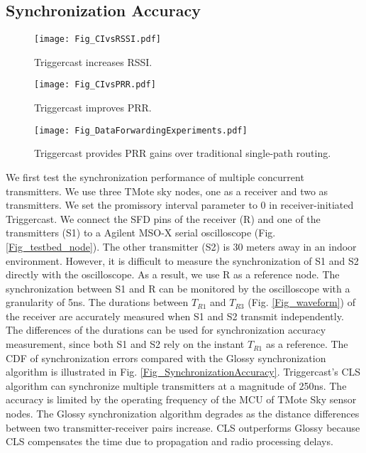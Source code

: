 \documentclass[conference]{IEEEtran}
\begin{document}
\subsection{Synchronization Accuracy}
\label{Subsec_SychronizationAccuracy}
\begin{figure*}[t]
  \centering
  \begin{minipage}[b]{0.32\textwidth}
    \centering
    \texttt{[image: Fig\_CIvsRSSI.pdf]}
    \caption{Triggercast increases RSSI.}
    \label{Fig_CIvsRSSI}\end{minipage}\hspace{0.01\linewidth}\begin{minipage}[b]{0.32\textwidth}
    \centering
    \texttt{[image: Fig\_CIvsPRR.pdf]}
    \caption{Triggercast improves PRR.}
    \label{Fig_CIvsPRR}
  \end{minipage}\hspace{0.01\linewidth}\begin{minipage}[b]{0.32\textwidth}
    \centering
    \texttt{[image: Fig\_DataForwardingExperiments.pdf]}
    \caption{Triggercast provides PRR gains over traditional single-path routing.}
    \label{Fig_DataForwardingExperiments}
  \end{minipage}\end{figure*}
\indent We first test the synchronization performance of multiple concurrent transmitters.
We use three TMote sky nodes, one as a receiver and two as transmitters.
We set the promissory interval parameter to 0 in receiver-initiated Triggercast.
We connect the SFD pins of the receiver (R) and one of the transmitters (S1) to a Agilent MSO-X serial oscilloscope (Fig. \ref{Fig_testbed_node}).
The other transmitter (S2) is 30 meters away in an indoor environment.
However, it is difficult to measure the synchronization of S1 and S2 directly with the oscilloscope.
As a result, we use R as a reference node.
The synchronization between S1 and R can be monitored by the oscilloscope with a granularity of 5ns.
The durations between $T_{R1}$ and $T_{R3}$ (Fig. \ref{Fig_waveform}) of the receiver are accurately measured when S1 and S2 transmit independently.
The differences of the durations can be used for synchronization accuracy measurement, since both S1 and S2 rely on the instant $T_{R1}$ as a reference.
The CDF of synchronization errors compared with the Glossy synchronization algorithm is illustrated in Fig. \ref{Fig_SynchronizationAccuracy}.
Triggercast's CLS algorithm can synchronize multiple transmitters at a magnitude of 250ns.
The accuracy is limited by the operating frequency of the MCU of TMote Sky sensor nodes.
The Glossy synchronization algorithm degrades as the distance differences between two transmitter-receiver pairs increase.
CLS outperforms Glossy because CLS compensates the time due to propagation and radio processing delays.
\end{document}
